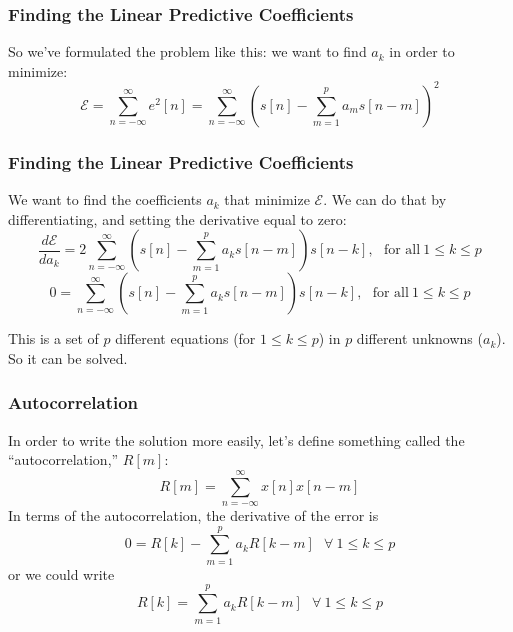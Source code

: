 \documentclass{beamer}
\begin{document}
\begin{frame}
  \frametitle{Finding the Linear Predictive Coefficients}

  So we've formulated the problem like this: we want to find $a_k$ in
  order to minimize:
  \begin{displaymath}
    {\mathcal E}=\sum_{n=-\infty}^\infty e^2[n] =
    \sum_{n=-\infty}^\infty\left(s[n]-\sum_{m=1}^p a_m s[n-m]\right)^2
  \end{displaymath}
\end{frame}
\begin{frame}
  \frametitle{Finding the Linear Predictive Coefficients}
  
  We want to find the coefficients $a_k$ that minimize ${\mathcal E}$.  We can do that by
  differentiating, and setting the derivative equal to zero:
  \begin{displaymath}
    \frac{d{\mathcal E}}{da_k} =
    2\sum_{n=-\infty}^\infty \left(s[n]-\sum_{m=1}^pa_k s[n-m]\right)s[n-k],~~~\mbox{for all}~1\le k\le p
  \end{displaymath}
  \begin{displaymath}
    0 = 
    \sum_{n=-\infty}^\infty \left(s[n]-\sum_{m=1}^pa_k s[n-m]\right)s[n-k],~~~\mbox{for all}~1\le k\le p
  \end{displaymath}

  This is a set of $p$ different equations (for $1\le k\le p$) in $p$
  different unknowns ($a_k$).  So it can be solved.
\end{frame}

\begin{frame}
  \frametitle{Autocorrelation}

  In order to write the solution more easily, let's define something
  called the ``autocorrelation,'' $R[m]$:
  \begin{displaymath}
    R[m] = \sum_{n=-\infty}^\infty x[n]x[n-m]
  \end{displaymath}
  In terms of the autocorrelation, the derivative of the error is
  \begin{displaymath}
    0 = R[k] -\sum_{m=1}^pa_k R[k-m]~~~\forall~1\le k\le p
  \end{displaymath}
  or we could write 
  \begin{displaymath}
    R[k] = \sum_{m=1}^pa_k R[k-m]~~~\forall~1\le k\le p
  \end{displaymath}
\end{frame}
\end{document}
